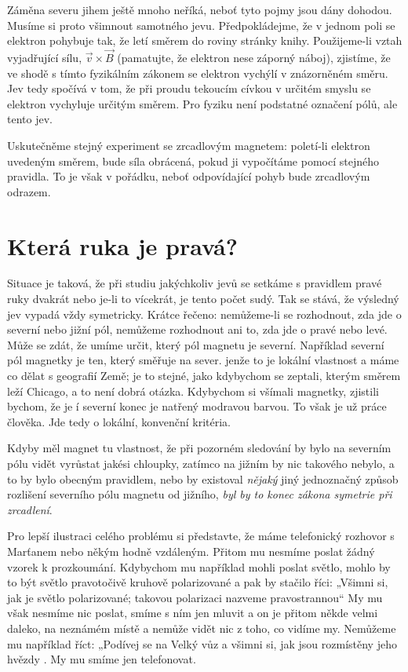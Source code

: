     Záměna severu jihem ještě mnoho neříká, neboť tyto pojmy jsou dány dohodou. Musíme si proto
    všimnout samotného jevu. Předpokládejme, že v jednom poli se elektron pohybuje tak, že letí
    směrem do roviny stránky knihy. Použijeme-li vztah vyjadřující sílu, \(\vec{v} \times \vec{B}\)
    (pamatujte, že elektron nese záporný náboj), zjistíme, že ve shodě s tímto fyzikálním zákonem se
    elektron vychýlí v znázorněném směru. Jev tedy spočívá v tom, že při proudu tekoucím cívkou v
    určitém smyslu se elektron vychyluje určitým směrem. Pro fyziku není podstatné označení pólů,
    ale tento jev.

    Uskutečněme stejný experiment se zrcadlovým magnetem: poletí-li elektron uvedeným směrem, bude
    síla obrácená, pokud ji vypočítáme pomocí stejného pravidla. To je však v pořádku, neboť
    odpovídající pohyb bude zrcadlovým odrazem.

  \section{Která ruka je pravá?}\label{fyz:IchapLIIsecVI}
    Situace je taková, že při studiu jakýchkoliv jevů se setkáme s pravidlem pravé ruky dvakrát nebo
    je-li to vícekrát, je tento počet sudý. Tak se stává, že výsledný jev vypadá vždy symetricky.
    Krátce řečeno: nemůžeme-li se rozhodnout, zda jde o severní nebo jižní pól, nemůžeme rozhodnout
    ani to, zda jde o pravé nebo levé. Může se zdát, že umíme určit, který pól magnetu je severní.
    Například severní pól magnetky je ten, který směřuje na sever. jenže to je lokální vlastnost a
    máme co dělat s geografií Země; je to stejné, jako kdybychom se zeptali, kterým směrem leží
    Chicago, a to není dobrá otázka. Kdybychom si všímali magnetky, zjistili bychom, že je í severní
    konec je natřený modravou barvou. To však je už práce člověka. Jde tedy o lokální, konvenční
    kritéria.
    
    Kdyby měl magnet tu vlastnost, že při pozorném sledování by bylo na severním pólu vidět vyrůstat
    jakési chloupky, zatímco na jižním by nic takového nebylo, a to by bylo obecným pravidlem, nebo
    by existoval \emph{nějaký} jiný jednoznačný způsob rozlišení severního pólu magnetu od jižního,
    \emph{byl by to konec zákona symetrie při zrcadlení}.

    Pro lepší ilustraci celého problému si představte, že máme telefonický rozhovor s Marťanem
    nebo někým hodně vzdáleným. Přitom mu nesmíme poslat žádný vzorek k prozkoumání. Kdybychom mu
    například mohli poslat světlo, mohlo by to být světlo pravotočivě kruhově polarizované a pak by
    stačilo říci: „Všimni si, jak je světlo polarizované; takovou polarizaci nazveme pravostrannou“
    My mu však nesmíme nic poslat, smíme s ním jen mluvit a on je přitom někde velmi daleko, na
    neznámém místě a nemůže vidět nic z toho, co vidíme my. Nemůžeme mu například říct: „Podívej se
    na Velký vůz a všimni si, jak jsou rozmístěny jeho hvězdy . My mu
    smíme jen telefonovat.

